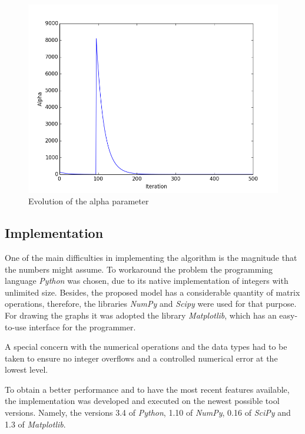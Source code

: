\documentclass[tuberlin,cic,tc,openright,english,noabntcite,oneside]{iiufrgs}
\begin{document}
\begin{figure}[H]
	\centering
    \caption{Evolution of the alpha parameter}
    \includegraphics[width=\textwidth]{fig_alpha_evolution}\par
    \label{fig:alpha_evolution}
\end{figure}

\subsection{Implementation}
One of the main difficulties in implementing the algorithm is the magnitude that the numbers might assume. To workaround the problem the programming language \emph{Python} was chosen, due to its native implementation of integers with unlimited size. Besides, the proposed model has a considerable quantity of matrix operations, therefore, the libraries \emph{NumPy} and \emph{Scipy} were used for that purpose. For drawing the graphs it was adopted the library \emph{Matplotlib}, which has an easy-to-use interface for the programmer.

A special concern with the numerical operations and the data types had to be taken to ensure no integer overflows and a controlled numerical error at the lowest level.

To obtain a better performance and to have the most recent features available, the implementation was developed and executed on the newest possible tool versions. Namely, the versions 3.4 of \emph{Python}, 1.10 of \emph{NumPy}, 0.16 of \emph{SciPy} and 1.3 of \emph{Matplotlib}.
\end{document}
